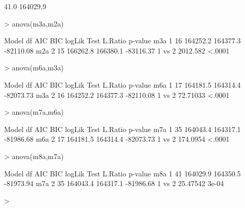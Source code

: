 \documentclass[11pt]{article}
\begin{document}
\begin{Schunk}
\begin{Soutput}
[1]     41.0 164029.9
\end{Soutput}
\begin{Sinput}
> anova(m3a,m2a)
\end{Sinput}
\begin{Soutput}
    Model df      AIC      BIC    logLik   Test  L.Ratio p-value
m3a     1 16 164252.2 164377.3 -82110.08                        
m2a     2 15 166262.8 166380.1 -83116.37 1 vs 2 2012.582  <.0001
\end{Soutput}
\begin{Sinput}
> anova(m6a,m3a)
\end{Sinput}
\begin{Soutput}
    Model df      AIC      BIC    logLik   Test  L.Ratio p-value
m6a     1 17 164181.5 164314.4 -82073.73                        
m3a     2 16 164252.2 164377.3 -82110.08 1 vs 2 72.71033  <.0001
\end{Soutput}
\begin{Sinput}
> anova(m7a,m6a)
\end{Sinput}
\begin{Soutput}
    Model df      AIC      BIC    logLik   Test  L.Ratio p-value
m7a     1 35 164043.4 164317.1 -81986.68                        
m6a     2 17 164181.5 164314.4 -82073.73 1 vs 2 174.0954  <.0001
\end{Soutput}
\begin{Sinput}
> anova(m8a,m7a)
\end{Sinput}
\begin{Soutput}
    Model df      AIC      BIC    logLik   Test  L.Ratio p-value
m8a     1 41 164029.9 164350.5 -81973.94                        
m7a     2 35 164043.4 164317.1 -81986.68 1 vs 2 25.47542   3e-04
\end{Soutput}
\begin{Sinput}
> 
\end{Sinput}
\end{Schunk}
\end{document}
